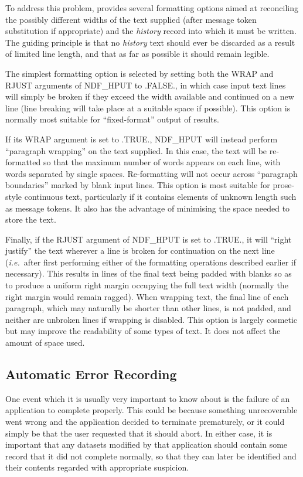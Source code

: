 \documentclass[twoside,11pt,nolof]{starlink}
\providecommand{\st}[1]{{\emph{#1}}}
\begin{document}
To address this problem,  provides several formatting options
aimed at reconciling the possibly different widths of the text
supplied (after message token substitution if appropriate) and the
\st{history\/} record into which it must be written. The guiding principle is
that no \st{history\/} text should ever be discarded as a result of limited
line length, and that as far as possible it should remain legible.

The simplest formatting option is selected by setting both the WRAP
and RJUST arguments of NDF\_HPUT to .FALSE., in which case input text
lines will simply be broken if they exceed the width available and
continued on a new line (line breaking will take place at a suitable
space if possible). This option is normally most suitable for
``fixed-format'' output of results.

If its WRAP argument is set to .TRUE., NDF\_HPUT will instead perform
``paragraph wrapping'' on the text supplied. In this case, the text
will be re-formatted so that the maximum number of words appears on
each line, with words separated by single spaces. Re-formatting will
not occur across ``paragraph boundaries'' marked by blank input lines.
This option is most suitable for prose-style continuous text,
particularly if it contains elements of unknown length such as message
tokens. It also has the advantage of minimising the space needed to
store the text.

Finally, if the RJUST argument of NDF\_HPUT is set to .TRUE., it will
``right justify'' the text wherever a line is broken for continuation
on the next line (\st{i.e.}\ after first performing either of the
formatting operations described earlier if necessary). This results in
lines of the final text being padded with blanks so as to produce a
uniform right margin occupying the full text width (normally the right
margin would remain ragged). When wrapping text, the final line of
each paragraph, which may naturally be shorter than other lines, is
not padded, and neither are unbroken lines if wrapping is disabled.
This option is largely cosmetic but may improve the readability of
some types of text. It does not affect the amount of space used.

\subsection{\label{ss:historyerror}Automatic Error Recording}

One event which it is usually very important to know about is the
failure of an application to complete properly. This could be because
something unrecoverable went wrong and the application decided to
terminate prematurely, or it could simply be that the user requested
that it should abort.  In either case, it is important that any
datasets modified by that application should contain some record that
it did not complete normally, so that they can later be identified and
their contents regarded with appropriate suspicion.
\end{document}
